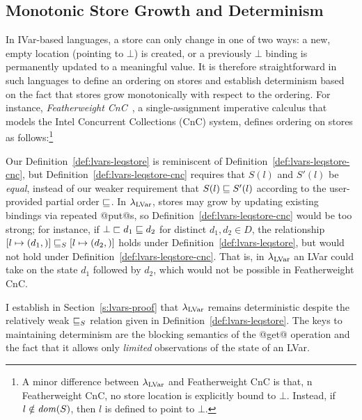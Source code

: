 \subsection{Monotonic Store Growth and Determinism}\label{subsection:lvars-monotonic-store-growth}

In IVar-based languages, a store can only change in one of two ways: a
new, empty location (pointing to $\bot$) is created, or a previously
$\bot$ binding is permanently updated to a meaningful value.  It is
therefore straightforward in such languages to define an ordering on
stores and establish determinism based on the fact that stores grow
monotonically with respect to the ordering. For instance,
\emph{Featherweight CnC}~\cite{CnC}, a single-assignment imperative
calculus that models the Intel Concurrent Collections (CnC) system,
defines ordering on stores as follows:\footnote{A minor difference
  between $\lambda_{\textrm{LVar}}$ and Featherweight CnC is that, n Featherweight
  CnC, no store location is explicitly bound to $\bot$.  Instead, if
  $l \notin \mathit{dom}(S)$, then $l$ is defined to point to $\bot$.}

\LVarsDefLeqStoreCnC

Our Definition~\ref{def:lvars-leqstore} is reminiscent of
Definition~\ref{def:lvars-leqstore-cnc}, but
Definition~\ref{def:lvars-leqstore-cnc} requires that $S(l)$ and
$S'(l)$ be \emph{equal}, instead of our weaker requirement that $S(l)
\sqsubseteq S'(l)$ according to the user-provided partial order
$\sqsubseteq$.  In $\lambda_{\textrm{LVar}}$, stores may grow by updating existing
bindings via repeated @put@s, so
Definition~\ref{def:lvars-leqstore-cnc} would be too strong; for
instance, if $\bot \sqsubset d_1 \sqsubseteq d_2$ for distinct $d_1, d_2
\in D$, the relationship
$\left[ l \mapsto (d_1, \right)] \sqsubseteq_S \left[ l \mapsto (d_2, \right)]$
holds under Definition~\ref{def:lvars-leqstore}, but would not hold
under Definition~\ref{def:lvars-leqstore-cnc}.  That is, in
$\lambda_{\textrm{LVar}}$ an LVar could take on the state $d_1$ followed by $d_2$,
which would not be possible in Featherweight CnC.

I establish in Section~\ref{s:lvars-proof} that $\lambda_{\textrm{LVar}}$ remains
deterministic despite the relatively weak $ \sqsubseteq_S $ relation
given in Definition~\ref{def:lvars-leqstore}.  The keys to maintaining
determinism are the blocking semantics of the @get@ operation and the
fact that it allows only \emph{limited} observations of the state of
an LVar.
